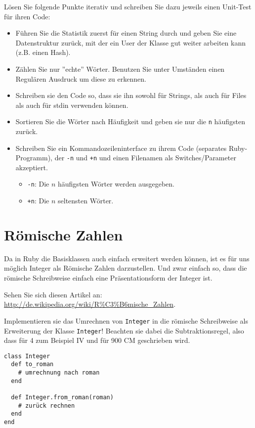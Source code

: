 \documentclass[a4paper,11pt,oneside]{scrbook}
\begin{document}
Lösen Sie folgende Punkte iterativ und schreiben Sie dazu jeweils einen Unit-Test für ihren Code:

\begin{itemize}
  \item Führen Sie die Statistik zuerst für einen String durch und geben Sie eine Datenstruktur zurück, mit der ein User der Klasse gut weiter arbeiten kann (z.B. einen Hash).
  \item Zählen Sie nur ''echte'' Wörter. Benutzen Sie unter Umständen einen Regulären Ausdruck um diese zu erkennen.
  \item Schreiben sie den Code so, dass sie ihn sowohl für Strings, als auch für Files als auch für stdin verwenden können.
  \item Sortieren Sie die Wörter nach Häufigkeit und geben sie nur die \texttt{n} häufigsten zurück.
  \item Schreiben Sie ein Kommandozeileninterface zu ihrem Code (separates Ruby-Programm), der \texttt{-n} und \texttt{+n} und einen Filenamen als Switches/Parameter akzeptiert.
  \begin{itemize}
    \item \texttt{-n}: Die $n$ häufigsten Wörter werden ausgegeben.
    \item \texttt{+n}: Die $n$ seltensten Wörter.
  \end{itemize}
  
\end{itemize}




\section{Römische Zahlen} %
\label{sec:römische_zahlen}
Da in Ruby die Basisklassen auch einfach erweitert werden können, ist es für uns möglich Integer als Römische Zahlen darzustellen. Und zwar einfach so, dass die römische Schreibweise einfach eine Präsentationsform der Integer ist.

Sehen Sie sich diesen Artikel an: \url{http://de.wikipedia.org/wiki/R%C3%B6mische_Zahlen}.

Implementieren sie das Umrechnen von \texttt{Integer} in die römische Schreibweise als Erweiterung der Klasse \texttt{Integer}! Beachten sie dabei die Subtraktionsregel, also dass für 4 zum Beispiel IV und für 900 CM geschrieben wird.

\begin{lstlisting}
class Integer
  def to_roman
    # umrechnung nach roman
  end

  def Integer.from_roman(roman)
    # zurück rechnen
  end
end
\end{lstlisting}
\end{document}
